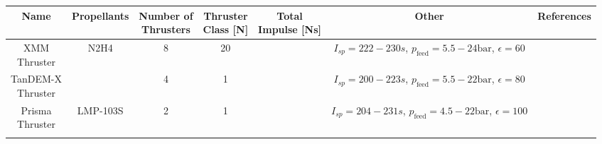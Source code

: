 \documentclass[12pt]{article}
\begin{document}
\newpage
\begin{adjustbox}{angle=90, center,caption={Overview of small propulsion systems using monopropellants.},float=table}
	\begin{tabular}{|c|c|c|c|c|c|c|}
		\hline
		Name & Propellants & \makecell{Number of\\Thrusters} & \makecell{Thruster\\Class {[}N{]}} & \makecell{Total\\Impulse [Ns]} & Other & References\\ \hline
		
		\makecell{XMM\\Thruster} & N2H4 & 8 & 20 & \makecell{$>517000$}  & \makecell{$I_{sp}=222-230s$,\\$p_{\text{feed}}=5.5-24\text{bar}$,\\$\epsilon=60$} & \makecell{ \cite{EsaXMM} \cite{ariane20N}} \\ \hline
		
		\makecell{TanDEM-X\\Thruster} & \makecell{N2H4} & 4 & 1 & \makecell{$>135000$}& \makecell{$I_{sp}=200-223s$,\\$p_{\text{feed}}=5.5-22\text{bar}$,\\$\epsilon=80$\\} & \makecell{\cite{tandemX} \cite{ariane1N}}\\ \hline
		
		\makecell{Prisma\\Thruster}& LMP-103S & 2 & 1 & \makecell{$\approx 108773$} & \makecell{$I_{sp}=204-231s$,\\$p_{\text{feed}}=4.5-22\text{bar}$,\\$\epsilon=100$} & \cite{hpgpThruster} \\ \hline
		\label{tab:reference}
	\end{tabular}
\end{adjustbox}

\newpage
\printbibliography 
 
\end{document}
